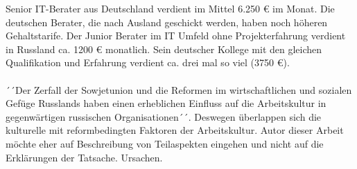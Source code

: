 	
	


	Senior IT-Berater aus Deutschland verdient im Mittel 6.250 € im Monat. Die deutschen Berater, die nach Ausland geschickt werden, haben noch höheren Gehaltstarife. %
	Der Junior Berater im IT Umfeld ohne Projekterfahrung  verdient in Russland ca. 1200 € monatlich.
	Sein deutscher Kollege mit den gleichen Qualifikation und Erfahrung verdient ca. drei mal so viel (3750 €).
	\\
	\\
	´´Der Zerfall der Sowjetunion und die Reformen im wirtschaftlichen und sozialen Gefüge Russlands haben einen erheblichen Einfluss auf die Arbeitskultur in gegenwärtigen russischen Organisationen´´. Deswegen überlappen sich die kulturelle mit reformbedingten Faktoren der Arbeitskultur. Autor dieser Arbeit möchte eher auf Beschreibung von Teilaspekten  eingehen und nicht auf die Erklärungen der Tatsache. Ursachen.\\%
	
